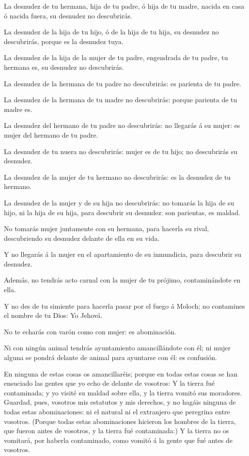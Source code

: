  La desnudez de tu hermana, hija de tu padre, ó hija de tu
madre, nacida en casa ó nacida fuera, su desnudez no descubrirás.

 La desnudez de la hija de tu hijo, ó de la hija de tu
hija, su desnudez no descubrirás, porque es la desnudez tuya.

 La desnudez de la hija de la mujer de tu padre, engendrada
de tu padre, tu hermana es, su desnudez no descubrirás.

 La desnudez de la hermana de tu padre no descubrirás: es
parienta de tu padre.

 La desnudez de la hermana de tu madre no descubrirás:
porque parienta de tu madre es.

 La desnudez del hermano de tu padre no descubrirás: no
llegarás á su mujer: es mujer del hermano de tu padre.

 La desnudez de tu nuera no descubrirás: mujer es de tu
hijo; no descubrirás su desnudez.

 La desnudez de la mujer de tu hermano no descubrirás: es
la desnudez de tu hermano.

 La desnudez de la mujer y de su hija no descubrirás: no
tomarás la hija de su hijo, ni la hija de su hija, para descubrir su
desnudez: son parientas, es maldad.

 No tomarás mujer juntamente con su hermana, para hacerla
su rival, descubriendo su desnudez delante de ella en su vida.

 Y no llegarás á la mujer en el apartamiento de su
inmundicia, para descubrir su desnudez.

 Además, no tendrás acto carnal con la mujer de tu prójimo,
contaminándote en ella.

 Y no des de tu simiente para hacerla pasar por el fuego á
Moloch; no contamines el nombre de tu Dios: Yo Jehová.

 No te echarás con varón como con mujer: es abominación.

 Ni con ningún animal tendrás ayuntamiento amancillándote
con él; ni mujer alguna se pondrá delante de animal para ayuntarse con
él: es confusión.

 En ninguna de estas cosas os amancillaréis; porque en
todas estas cosas se han ensuciado las gentes que yo echo de delante de
vosotros:  Y la tierra fué contaminada; y yo visité su
maldad sobre ella, y la tierra vomitó sus moradores. 
Guardad, pues, vosotros mis estatutos y mis derechos, y no hagáis
ninguna de todas estas abominaciones: ni el natural ni el extranjero que
peregrina entre vosotros.  (Porque todas estas
abominaciones hicieron los hombres de la tierra, que fueron antes de
vosotros, y la tierra fué contaminada:)  Y la tierra no os
vomitará, por haberla contaminado, como vomitó á la gente que fué antes
de vosotros.

